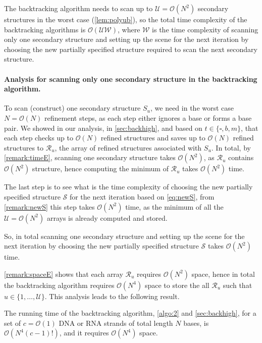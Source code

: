 The backtracking algorithm needs to scan up to $\mathcal{U} = \mathcal{O}(N^2)$ secondary structures in the worst case ({\cref{lem:polyub}}), so the total time complexity of the backtracking algorithms is $\mathcal{O}(\mathcal{U} \mathcal{W})$, where $\mathcal{W}$ is the time complexity of scanning only one secondary structure and setting up the scene for the next iteration by choosing the new partially specified structure required to scan the next secondary structure. 

\paragraph{Analysis for scanning only one secondary structure in the backtracking algorithm.}
To scan (construct) one secondary structure $S_u$, we need in the worst case  $N = \mathcal{O}(N)$ refinement steps, as each step either ignores a base or forms a base pair. We showed in our analysis, in \cref{sec:backhigh}, and based on $t \in \{\square,b,m\}$, that each step checks up to $\mathcal{O}(N)$ refined structures and saves up to $\mathcal{O}(N)$ refined structures to $\mathcal{R}_u$, the array of refined structures associated with $S_u$. In total, by \cref{remark:timeE}, scanning one secondary structure takes $\mathcal{O}(N^2)$, as $\mathcal{R}_u$ contains $\mathcal{O}(N^2)$ structure, hence computing the minimum of $\mathcal{R}_u$ takes $\mathcal{O}(N^2)$ time. 

The last step is to see what is the time complexity of choosing the new partially specified structure $\mathcal{S}$ for the next iteration based on \cref{eq:newS}, from \cref{remark:newS} this step takes $\mathcal{O}(N^2)$ time, as the minimum of all the $\mathcal{U} = \mathcal{O}(N^2)$ arrays is already computed and stored. 

So, in total scanning one secondary structure and setting up the scene for the next iteration by choosing the new partially specified structure $\mathcal{S}$ takes $\mathcal{O}(N^2)$ time.

\cref{remark:spaceE} shows that each array $\mathcal{R}_u$ requires $\mathcal{O}(N^2)$ space, hence in total the backtracking algorithm requires $\mathcal{O}(N^4)$ space to store the all $\mathcal{R}_u$ such that $u \in \{1, \ldots, \mathcal{U}\}$. This analysis leads to the following result.

\begin{lemma}\label{lem:BTtime}
	The running time  of the backtracking algorithm,   \cref{algo:2} and \cref{sec:backhigh},
	for a set of $c = \mathcal{O}(1)$ DNA or RNA strands of total length  $N$ bases, is $\mathcal{O}(N^4(c-1)!)$, and it requires $\mathcal{O}(N^4)$ space.  
\end{lemma}

